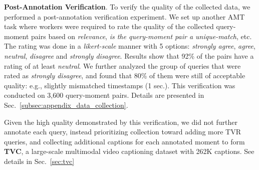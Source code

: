 \documentclass[runningheads]{llncs}
\begin{document}
\noindent\textbf{Post-Annotation Verification}. 
To verify the quality of the collected data, we performed a post-annotation verification experiment. 
We set up another AMT task where workers were required to rate the quality of the collected query-moment pairs based on \textit{relevance}, \textit{is the query-moment pair a unique-match}, etc. 
The rating was done in a \textit{likert-scale} manner with 5 options: \textit{strongly agree}, \textit{agree}, \textit{neutral}, \textit{disagree} and \textit{strongly disagree}. 
Results show that 92\% of the pairs have a rating of at least \textit{neutral}.
We further analyzed the group of queries that were rated as \textit{strongly disagree}, and found that 80\% of them were still of acceptable quality: e.g., slightly mismatched timestamps (1 sec.). 
This verification was conducted on 3,600 query-moment pairs. 
Details are presented in Sec.~\ref{subsec:appendix_data_collection}. 

Given the high quality demonstrated by this verification, we did not further annotate each query, instead prioritizing collection toward  adding more TVR queries, and collecting additional captions for each annotated moment to form \textbf{TVC}, a large-scale multimodal video captioning dataset with 262K captions. See details in Sec.~\ref{sec:tvc}
\end{document}
